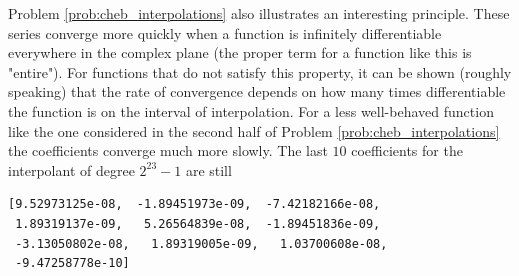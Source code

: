 Problem \ref{prob:cheb_interpolations} also illustrates an interesting principle.
These series converge more quickly when a function is infinitely differentiable everywhere in the complex plane (the proper term for a function like this is "entire").
For functions that do not satisfy this property, it can be shown (roughly speaking) that the rate of convergence depends on how many times differentiable the function is on the interval of interpolation.
For a less well-behaved function like the one considered in the second half of Problem \ref{prob:cheb_interpolations} the coefficients converge much more slowly.
The last $10$ coefficients for the interpolant of degree $2^{23} - 1$ are still
\begin{lstlisting}
[9.52973125e-08,  -1.89451973e-09,  -7.42182166e-08,
 1.89319137e-09,   5.26564839e-08,  -1.89451836e-09,
 -3.13050802e-08,   1.89319005e-09,   1.03700608e-08,
 -9.47258778e-10]
\end{lstlisting}
